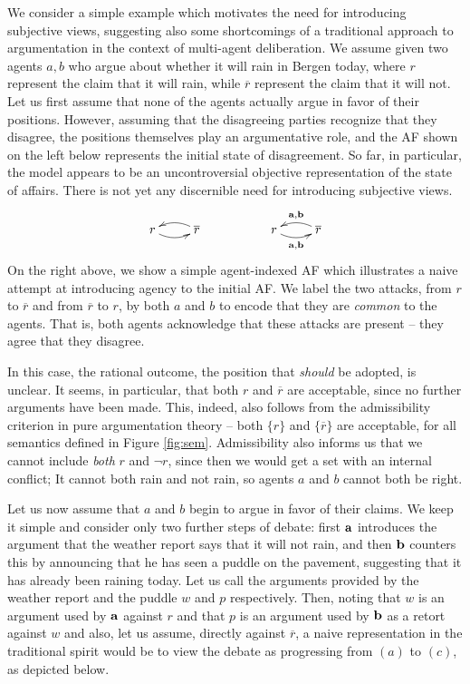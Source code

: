 \documentclass[greybox]{svmult}
\renewcommand{\bar}[1]{\overline{#1}}
\begin{document}
\begin{example}\label{ex:run}

We consider a simple example which motivates the need for introducing subjective views, suggesting also some shortcomings of a traditional approach to argumentation in the context of multi-agent deliberation. We assume given two agents $a,b$ who argue about whether it will rain in Bergen today, where $r$ represent the claim that it will rain, while $\overline r$ represent the claim that it will not. Let us first assume that none of the agents actually argue in favor of their positions. However, assuming that the disagreeing parties recognize that they disagree, the positions themselves play an argumentative role, and the AF shown on the left below represents the initial state of disagreement. So far, in particular, the model appears to be an uncontroversial objective representation of the state of affairs. There is not yet any discernible need for introducing subjective views. 
$$
\begin{array}{ccc}
\xymatrix{ r \ar@/_/[r] & \overline r \ar@/_/[l] } & \hspace{3em} &
\xymatrix{ r \ar@/_/[r]_{{\bf a},{\bf b}} & \bar r \ar@/_/[l]_{{\bf a},{\bf b}} }
\end{array}
$$
On the right above, we show a simple agent-indexed AF which illustrates a naive attempt at introducing agency to the initial AF. We label the two attacks, from $r$ to $\overline r$ and from $\overline r$ to $r$, by both $a$ and $b$ to encode that they are \emph{common} to the agents. That is, both agents acknowledge that these attacks are present -- they agree that they disagree.

In this case, the rational outcome, the position that \emph{should} be adopted, is unclear. It seems, in particular, that both $r$ and $\bar r$ are acceptable, since no further arguments have been made. This, indeed, also follows from the admissibility criterion in pure argumentation theory -- both $\{r\}$ and $\{\bar r\}$ are acceptable, for all semantics defined in Figure \ref{fig:sem}. Admissibility also informs us that we cannot include \emph{both} $r$ and $\neg r$, since then we would get a set with an internal conflict; It cannot both rain and not rain, so agents $a$ and $b$ cannot both be right.

Let us now assume that $a$ and $b$ begin to argue in favor of their claims. We keep it simple and consider only two further steps of debate: first ${\bf a}$ introduces the argument that the weather report says that it will not rain, and then ${\bf b}$ counters this by announcing that he has seen a puddle on the pavement, suggesting that it has already been raining today. Let us call the arguments provided by the weather report and the puddle $w$ and $p$ respectively. Then, noting that $w$ is an argument used by ${\bf a}$ against $r$ and that $p$ is an argument used by ${\bf b}$ as a retort against $w$ and also, let us assume, directly against $\bar r$, a naive representation in the traditional spirit would be to view the debate as progressing from $(a)$ to $(c)$, as depicted below.


\end{example}
\end{document}
